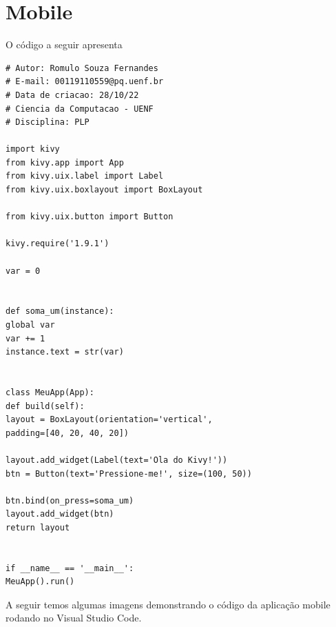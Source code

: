     \section{Mobile}
    O código a seguir apresenta
    \begin{lstlisting}
# Autor: Romulo Souza Fernandes
# E-mail: 00119110559@pq.uenf.br
# Data de criacao: 28/10/22
# Ciencia da Computacao - UENF
# Disciplina: PLP

import kivy
from kivy.app import App
from kivy.uix.label import Label
from kivy.uix.boxlayout import BoxLayout

from kivy.uix.button import Button

kivy.require('1.9.1')

var = 0


def soma_um(instance):
global var
var += 1
instance.text = str(var)


class MeuApp(App):
def build(self):
layout = BoxLayout(orientation='vertical',
padding=[40, 20, 40, 20])

layout.add_widget(Label(text='Ola do Kivy!'))
btn = Button(text='Pressione-me!', size=(100, 50))

btn.bind(on_press=soma_um)
layout.add_widget(btn)
return layout


if __name__ == '__main__':
MeuApp().run()
    \end{lstlisting}
	A seguir temos algumas imagens demonstrando o código da aplicação mobile rodando no Visual Studio Code.
